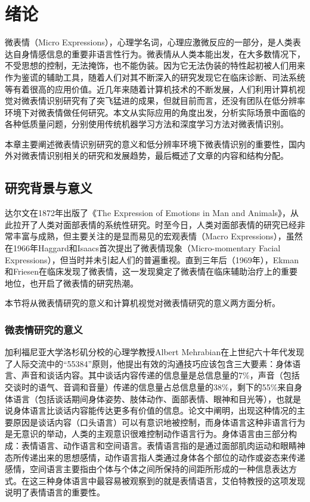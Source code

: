 \chapter{绪论}\label{chap:introduction}

微表情（Micro Expressions），心理学名词，心理应激微反应的一部分，是人类表达自身情感信息的重要非语言性行为。微表情从人类本能出发，在大多数情况下，不受思想的控制，无法掩饰，也不能伪装\citep{Haggard1966}。因为它无法伪装的特性起初被人们用来作为鉴谎的辅助工具，随着人们对其不断深入的研究发现它在临床诊断、司法系统等有着很高的应用价值。近几年来随着计算机技术的不断发展，人们利用计算机视觉对微表情识别研究有了突飞猛进的成果，但就目前而言，还没有团队在低分辨率环境下对微表情做任何研究。本文从实际应用的角度出发，分析实际场景中面临的各种低质量问题，分别使用传统机器学习方法和深度学习方法对微表情识别。

本章主要阐述微表情识别研究的意义和低分辨率环境下微表情识别的重要性，国内外对微表情识别相关的研究和发展趋势，最后概述了文章的内容和结构分配。

\section{研究背景与意义}

达尔文在1872年出版了《The Expression of Emotions in Man and Animals》，从此拉开了人类对面部表情的系统性研究。时至今日，人类对面部表情的研究已经非常丰富与成熟，但主要关注的是显而易见的宏观表情（Macro Expressions），虽然在1966年Haggard和Isaacs首次提出了微表情现象（Micro-momentary Facial Expressions），但当时并未引起人们的普遍重视。直到三年后（1969年），Ekman和Friesen在临床发现了微表情，这一发现奠定了微表情在临床辅助治疗上的重要地位\citep{ekman1969nonverbal}，也开启了微表情的研究热潮。

本节将从微表情研究的意义和计算机视觉对微表情研究的意义两方面分析。

\subsection{微表情研究的意义}

加利福尼亚大学洛杉矶分校的心理学教授Albert Mehrabian在上世纪六十年代发现了人际交流中的“55384”原则，他提出有效的沟通技巧应该包含三大要素：身体语言、声音和谈话内容\citep{Mehrabian1967Inference}。其中谈话内容传递的信息量是总信息量的7\%，声音（包括交谈时的语气、音调和音量）传递的信息量占总信息量的38\%，剩下的55\%来自身体语言（包括谈话期间身体姿势、肢体动作、面部表情、眼神和目光等），也就是说身体语言比谈话内容能传达更多有价值的信息。论文中阐明，出现这种情况的主要原因是谈话内容（口头语言）可以有意识地被控制，而身体语言这种非语言行为是无意识的举动，人类的主观意识很难控制动作语言行为。身体语言由三部分构成：表情语言、动作语言和空间语言。表情语言指的是通过面部肌肉运动和眼睛神态所传递出来的思想感情，动作语言指人类通过身体各个部位的动作或姿态来传递感情，空间语言主要指由个体与个体之间所保持的间距所形成的一种信息表达方式。在这三种身体语言中最容易被观察到的就是表情语言，艾伯特教授的这项发现说明了表情语言的重要性。


